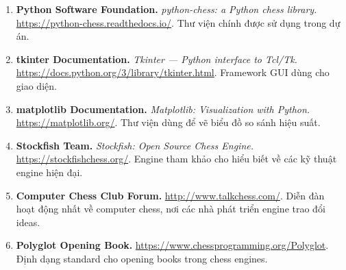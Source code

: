 \begin{enumerate}
    \item \textbf{Python Software Foundation.} \textit{python-chess: a Python chess library.} \url{https://python-chess.readthedocs.io/}. Thư viện chính được sử dụng trong dự án.

    \item \textbf{tkinter Documentation.} \textit{Tkinter — Python interface to Tcl/Tk.} \url{https://docs.python.org/3/library/tkinter.html}. Framework GUI dùng cho giao diện.

    \item \textbf{matplotlib Documentation.} \textit{Matplotlib: Visualization with Python.} \url{https://matplotlib.org/}. Thư viện dùng để vẽ biểu đồ so sánh hiệu suất.

    \item \textbf{Stockfish Team.} \textit{Stockfish: Open Source Chess Engine.} \url{https://stockfishchess.org/}. Engine tham khảo cho hiểu biết về các kỹ thuật engine hiện đại.

    \item \textbf{Computer Chess Club Forum.} \url{http://www.talkchess.com/}. Diễn đàn hoạt động nhất về computer chess, nơi các nhà phát triển engine trao đổi ideas.

    \item \textbf{Polyglot Opening Book.} \url{https://www.chessprogramming.org/Polyglot}. Định dạng standard cho opening books trong chess engines.
\end{enumerate}

